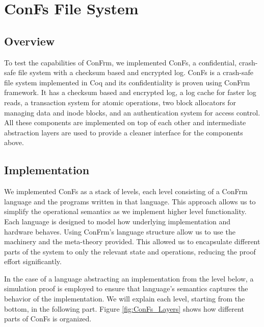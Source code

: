 \chapter{ConFs File System}

\section{Overview}
To test the capabilities of ConFrm, we implemented ConFs, a confidential, crash-safe file system with a checksum based and encrypted log. 
ConFs is a crash-safe file system implemented in Coq and its confidentiality is proven using ConFrm framework. It has a checksum based and encrypted log, a log cache for faster log reads, a transaction system for atomic operations, two block allocators for managing data and inode blocks, and an authentication system for access control. All these components are implemented on top of each other and intermediate abstraction layers are used to provide a cleaner interface for the components above.

\section{Implementation}
We implemented ConFs as a stack of levels, each level consisting of a ConFrm language and the programs written in that language. This approach allows us to simplify the operational semantics as we implement higher level functionality. Each language is designed to model how underlying implementation and hardware behaves. Using ConFrm's language structure allow us to use the machinery and the meta-theory provided. This allowed us to encapsulate different parts of the system to only the relevant state and operations, reducing the proof effort significantly.

In the case of a language abstracting an implementation from the level below, a simulation proof is employed to ensure that language's semantics captures the behavior of the implementation. We will explain each level, starting from the bottom, in the following part. Figure \ref{fig:ConFs_Layers} shows how different parts of ConFs is organized.

